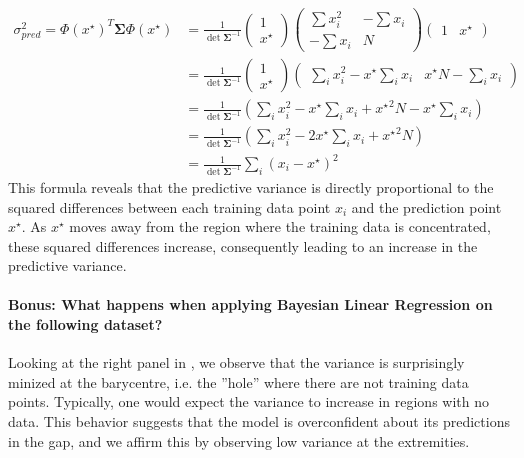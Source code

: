 \begin{align*}
    \sigma^2_{pred} = \Phi (x^\star ) ^T \boldsymbol{\Sigma} \Phi (x^\star ) &= \frac{1}{\det \boldsymbol{\Sigma}^{-1}} \begin{pmatrix}
        1 \\
        x^\star 
    \end{pmatrix} \begin{pmatrix}
        \sum x_i^2 & - \sum x_i \\
        - \sum x_i & N
    \end{pmatrix}\begin{pmatrix}
        1 & x^\star 
    \end{pmatrix} \\
    &= \frac{1}{\det \boldsymbol{\Sigma}^{-1}} \begin{pmatrix}1 \\ x^\star \end{pmatrix} \begin{pmatrix}\sum_i x_i^2 - x^\star \sum_i x_i & x^\star N - \sum_i x_i\end{pmatrix} \\
    &= \frac{1}{\det \boldsymbol{\Sigma}^{-1}}\left(\sum_i x_i^2 - x^\star \sum_i x_i + {x^\star }^2 N - x^\star \sum_i x_i\right) \\
    &= \frac{1}{\det \boldsymbol{\Sigma}^{-1}}\left(\sum_i x_i^2 - 2 x^\star \sum_i x_i + {x^\star }^2 N\right) \\
    &= \frac{1}{\det \boldsymbol{\Sigma}^{-1}}\sum_i \left(x_i - x^\star \right)^2
\end{align*}
This formula reveals that the predictive variance is directly proportional to the squared differences between each training data point $x_i$ and the prediction point $x^\star$. As $x^\star$ moves away from the region where the training data is concentrated, these squared differences increase, consequently leading to an increase in the predictive variance.

\paragraph*{Bonus: What happens when applying Bayesian Linear Regression on the following dataset?}

Looking at the right panel in , we observe that the variance is surprisingly minized at the barycentre, i.e. the ''hole'' where there are not training data points. Typically, one would expect the variance to increase in regions with no data. This behavior suggests that the model is overconfident about its predictions in the gap, and we affirm this by observing low variance at the extremities.

